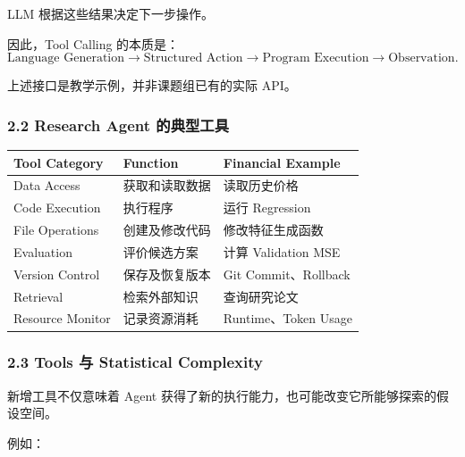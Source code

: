 LLM 根据这些结果决定下一步操作。

因此，Tool Calling 的本质是：
\[\text{Language Generation}
\longrightarrow
\text{Structured Action}
\longrightarrow
\text{Program Execution}
\longrightarrow
\text{Observation}.\]

上述接口是教学示例，并非课题组已有的实际 API。

\hypertarget{part-3-34-0001-research-agent-ux7684ux5178ux578bux5de5ux5177}{%
\subsubsection{2.2 Research Agent 的典型工具}\label{part-3-34-0001-research-agent-ux7684ux5178ux578bux5de5ux5177}}

\begin{readertable}
\begin{longtable}[]{@{}
  >{\raggedright\arraybackslash}p{}
  >{\raggedright\arraybackslash}p{}
  >{\raggedright\arraybackslash}p{}@{}}
\toprule
Tool Category & Function & Financial Example \\
\midrule
\endhead
Data Access & 获取和读取数据 & 读取历史价格 \\
Code Execution & 执行程序 & 运行 Regression \\
File Operations & 创建及修改代码 & 修改特征生成函数 \\
Evaluation & 评价候选方案 & 计算 Validation MSE \\
Version Control & 保存及恢复版本 & Git Commit、Rollback \\
Retrieval & 检索外部知识 & 查询研究论文 \\
Resource Monitor & 记录资源消耗 & Runtime、Token Usage \\
\bottomrule
\end{longtable}
\end{readertable}

\hypertarget{part-3-34-0001-tools-ux4e0e-statistical-complexity}{%
\subsubsection{2.3 Tools 与 Statistical Complexity}\label{part-3-34-0001-tools-ux4e0e-statistical-complexity}}

新增工具不仅意味着 Agent 获得了新的执行能力，也可能改变它所能够探索的假设空间。

例如：

